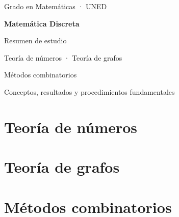 \documentclass[11pt,a4paper,oneside]{book}
\begin{document}
\frontmatter
\hypersetup{pageanchor=false}
\begin{titlepage}
\centering
\vspace*{3cm}
{\Large Grado en Matemáticas · UNED\par}
\vspace{1.5cm}
{\Huge\bfseries Matemática Discreta\par}
\vspace{1cm}
{\Large Resumen de estudio\par}
\vfill
{\large Teoría de números · Teoría de grafos\par}
\medskip
{\large Métodos combinatorios\par}
\vspace{1cm}
{\small Conceptos, resultados y procedimientos fundamentales\par}
\end{titlepage}
\hypersetup{pageanchor=true}
{\setlength{\parskip}{0pt}\tableofcontents}
\mainmatter
\part{Teoría de números}






\part{Teoría de grafos}




\part{Métodos combinatorios}





\end{document}
